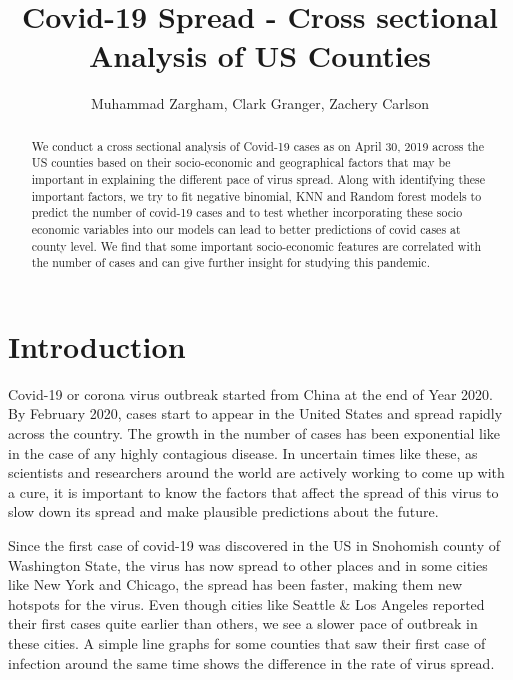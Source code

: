 \documentclass[
]{article}
\title{Covid-19 Spread - Cross sectional Analysis of US Counties}
\author{Muhammad Zargham, Clark Granger, Zachery Carlson}
\date{}
\begin{document}
\maketitle

\begin{abstract}
We conduct a cross sectional analysis of Covid-19 cases as on April 30, 2019 across the US counties based on their socio-economic and geographical factors that may be important in explaining the different pace of virus spread. Along with identifying these important factors, we try to fit negative binomial, KNN and Random forest models to predict the number of covid-19 cases and to test whether incorporating these socio economic variables into our models can lead to better predictions of covid cases at county level. We find that some important socio-economic features are correlated with the number of cases and can give further insight for studying this pandemic.  
\end{abstract}
\newpage

{
\setcounter{tocdepth}{2}
\tableofcontents
}
\newpage

\hypertarget{introduction}{%
\section{Introduction}\label{introduction}}

Covid-19 or corona virus outbreak started from China at the end of Year
2020. By February 2020, cases start to appear in the United States and
spread rapidly across the country. The growth in the number of cases has
been exponential like in the case of any highly contagious disease. In
uncertain times like these, as scientists and researchers around the
world are actively working to come up with a cure, it is important to
know the factors that affect the spread of this virus to slow down its
spread and make plausible predictions about the future.

Since the first case of covid-19 was discovered in the US in Snohomish
county of Washington State, the virus has now spread to other places and
in some cities like New York and Chicago, the spread has been faster,
making them new hotspots for the virus. Even though cities like Seattle
\& Los Angeles reported their first cases quite earlier than others, we
see a slower pace of outbreak in these cities. A simple line graphs for
some counties that saw their first case of infection around the same
time shows the difference in the rate of virus spread.
\end{document}
